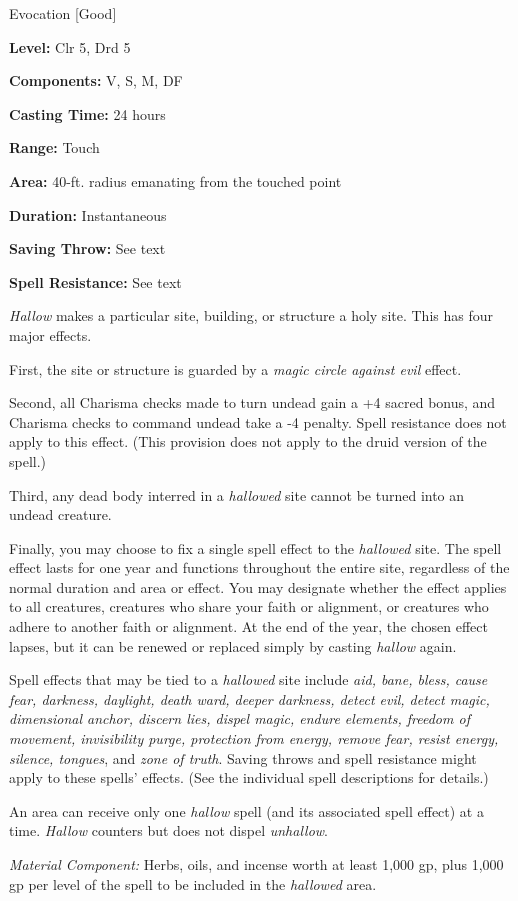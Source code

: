 
Evocation [Good]

\textbf{Level:} Clr 5, Drd 5

\textbf{Components:} V, S, M, DF

\textbf{Casting Time:} 24 hours

\textbf{Range:} Touch

\textbf{Area:} 40-ft. radius emanating from the touched point

\textbf{Duration:} Instantaneous

\textbf{Saving Throw:} See text

\textbf{Spell Resistance:} See text

\textit{Hallow} makes a particular site, building, or structure a holy site. This 
has four major effects.

First, the site or structure is guarded by a \textit{magic circle against evil}
effect.

Second, all Charisma checks made to turn undead gain a +4 sacred bonus, and Charisma 
checks to command undead take a -4 penalty. Spell resistance does not apply to 
this effect. (This provision does not apply to the druid version of the spell.)

Third, any dead body interred in a \textit{hallowed} site cannot be turned into 
an undead creature.

Finally, you may choose to fix a single spell effect to the \textit{hallowed} site. 
The spell effect lasts for one year and functions throughout the entire site, regardless 
of the normal duration and area or effect. You may designate whether the effect 
applies to all creatures, creatures who share your faith or alignment, or creatures 
who adhere to another faith or alignment. At the end of the year, the chosen effect 
lapses, but it can be renewed or replaced simply by casting \textit{hallow} again.

Spell effects that may be tied to a \textit{hallowed} site include \textit{aid, 
bane, bless, cause fear, darkness, daylight, death ward, deeper darkness, detect 
evil, detect magic, dimensional anchor, discern lies, dispel magic, endure elements, 
freedom of movement, invisibility purge, protection from energy, remove fear, resist 
energy, silence, tongues}, and \textit{zone of truth}. Saving throws and spell 
resistance might apply to these spells' effects. (See the individual spell descriptions 
for details.)

An area can receive only one \textit{hallow} spell (and its associated spell effect) 
at a time. \textit{Hallow} counters but does not dispel \textit{unhallow}.

\textit{Material Component:} Herbs, oils, and incense worth at least 1,000 gp, 
plus 1,000 gp per level of the spell to be included in the \textit{hallowed} area.


